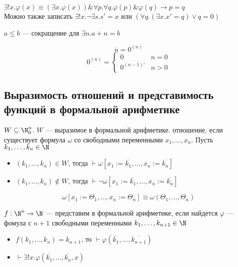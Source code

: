 \documentclass[oneside]{book}
\begin{document}
\begin{definition}
	\(\exists! x.\varphi(x) \equiv (\exists x. \varphi(x))\&\forall p.\forall q. \varphi(p)\&\varphi(q) \to p = q\) \\
	Можно также записать \(\exists ! x.\neg \exists s. s' = x\) или \((\forall q.(\exists x. x' = q)\vee q= 0)\)
\end{definition}
\begin{definition}
	\(a \le b\) --- сокращение для \(\exists n. a + n = b\)
\end{definition}
\begin{definition}
	\[ \overline{n} = 0^{(n)}\]
	\[ 0^{(n)} = \begin{cases}
			0            & n = 0 \\
			0^{(n - 1)'} & n > 0
		\end{cases}\]
\end{definition}
\subsection{Выразимость отношений и представимость функций в формальной арифметике}
\label{sec:orgc5dbd97}
\begin{definition}
	\(W \subseteq \N_0^n\). \(W\) --- выразимое в формальной арифметике. отношение, если существует формула \(\omega\) со свободными переменными \(x_1,\dots,x_n\). Пусть \(k_1,\dots,k_n \in \N\)
	\begin{itemize}
		\item \((k_1,\dots,k_n) \in W\), тогда \(\vdash \omega[x_1:=\overline{k_1}, \dots, x_n := \overline{k_n}]\)
		\item \((k_1,\dots,k_n) \not\in W\), тогда \(\vdash \neg \omega[x_1:=\overline{k_1},\dots,x_n:=\overline{k_n}]\)
	\end{itemize}
	\[ \omega[x_1:=\Theta_1,\dots,x_n:=\Theta_n] \equiv \omega(\Theta_1, \dots, \Theta_n) \]
	\label{orgb52a57d}
\end{definition}
\begin{definition}
	\(f: \N^n \to \N\) --- представим в формальной арифметике, если найдется \(\varphi\) --- фомула с \(n + 1\) свободными переменными \(k_1, \dots, k_{n + 1} \in \N\)
	\begin{itemize}
		\item \(f(k_1,\dots,k_n) = k_{n + 1}\), то \(\vdash \varphi(\overline{k_1},\dots,\overline{k_{n + 1}})\) \\
		\item \(\vdash \exists! x.\varphi(\overline{k_1},\dots,\overline{k_n},x)\)
	\end{itemize}
	\label{org999b088}
\end{definition}
\end{document}
